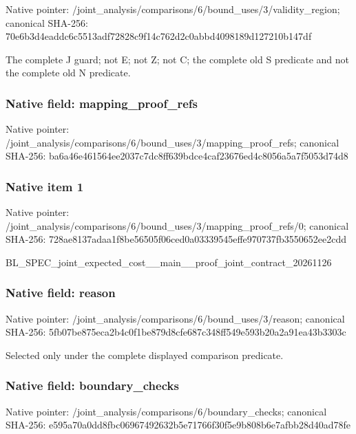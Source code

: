 \documentclass[10pt,a4paper]{article}
\begin{document}
Native pointer: /joint\_analysis/comparis\allowbreak{}ons/6/bound\_uses/3/valid\allowbreak{}ity\_region; canonical SHA-256: 70e6b3d4eaddc6c5513adf72\allowbreak{}828c9f14c762d2c0abbd4098\allowbreak{}189d127210b147df


The complete J guard; not E; not Z; not C; the complete old S predicate and not the complete old N predicate.


\subsubsection{Native field: mapping\_proof\_refs}


Native pointer: /joint\_analysis/comparis\allowbreak{}ons/6/bound\_uses/3/mappi\allowbreak{}ng\_proof\_refs; canonical SHA-256: ba6a46e461564ee2037c7dc8\allowbreak{}ff639bdce4caf23676ed4c80\allowbreak{}56a5a7f5053d74d8



\subsubsection{Native item 1}


Native pointer: /joint\_analysis/comparis\allowbreak{}ons/6/bound\_uses/3/mappi\allowbreak{}ng\_proof\_refs/0; canonical SHA-256: 728ae8137adaa1f8be56505f\allowbreak{}06ced0a03339545effe97073\allowbreak{}7fb3550652ee2cdd


BL\_SPEC\_joint\_expected\_c\allowbreak{}ost\_\_main\_\_proof\_joint\_c\allowbreak{}ontract\_20261126


\subsubsection{Native field: reason}


Native pointer: /joint\_analysis/comparis\allowbreak{}ons/6/bound\_uses/3/reaso\allowbreak{}n; canonical SHA-256: 5fb07be875eca2b4c0f1be87\allowbreak{}9d8cfe687c348ff549e593b2\allowbreak{}0a2a91ea43b3303c


Selected only under the complete displayed comparison predicate.


\subsubsection{Native field: boundary\_checks}


Native pointer: /joint\_analysis/comparis\allowbreak{}ons/6/boundary\_checks; canonical SHA-256: e595a70a0dd8fbc069674926\allowbreak{}32b5e71766f30f5e9b808b6e\allowbreak{}7afbb28d40ad78fe
\end{document}
